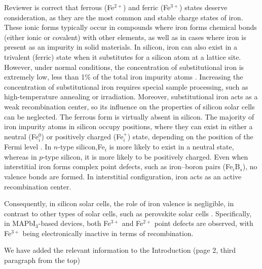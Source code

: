 \documentclass[a4paper,fleqn]{cas-sc}
\begin{document}
Reviewer is correct that ferrous (Fe$^{2+}$) and ferric (Fe$^{3+}$) states deserve consideration,
as they are the most common and stable charge states of iron.
These ionic forms typically occur in compounds where iron forms chemical bonds (either ionic or covalent) with other elements,
as well as in cases where iron is present as an impurity in solid materials.
In silicon, iron can also exist in a trivalent (ferric) state when it substitutes for a silicon atom at a lattice site.
However, under normal conditions, the concentration of substitutional iron is extremely low, less than 1\% of the total iron impurity atoms \cite{Wright2016}.
Increasing the concentration of substitutional iron requires special sample processing, such as high-temperature annealing or irradiation.
Moreover, substitutional iron acts as a weak recombination center,
so its influence on the properties of silicon solar cells can be neglected.
The ferrous form is virtually absent in silicon.
The majority of iron impurity atoms in silicon occupy positions,
where they can exist in either a neutral (Fe$_i^0$) or positively charged (Fe$_i^+$) state,
depending on the position of the Fermi level \cite{Istratov1999}.
In $n$-type silicon,Fe$_i$ is more likely to exist in a neutral state,
whereas in $p$-type silicon, it is more likely to be positively charged.
Even when interstitial iron forms complex point defects, such as iron–boron pairs (Fe$_i$B$_s$), no valence bonds are formed.
In interstitial configuration, iron acts as an active recombination center.

Consequently, in silicon solar cells, the role of iron valence is negligible,
in contrast to other types of solar cells, such as perovskite solar cells \cite{Poindexter2017}.
Specifically, in MAPbI$_3$-based devices, both Fe$^{3+}$ and Fe$^{2+}$  point defects are observed,
with Fe$^{3+}$ being electronically inactive in terms of recombination.

We have added the relevant information to the Introduction (page 2, third paragraph from the top)
\end{document}
